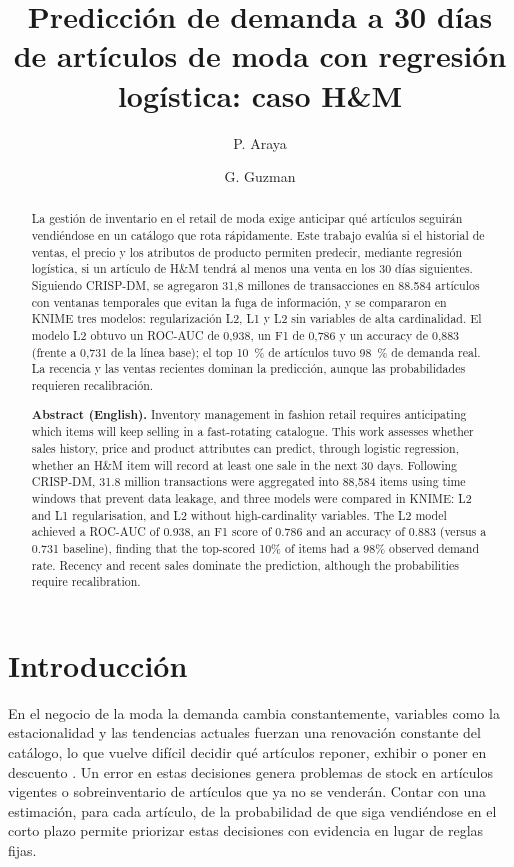 \documentclass[
  journal=largetwo,
  manuscript=Laboratorio-Numero-02,
  year=2026,
  volume=1
]{cup-journal}
\title{Predicción de demanda a 30 días de artículos de moda con regresión logística: caso H\&M}
\author{P. Araya}
\affiliation{C1, Universidad Católica del Norte, Coquimbo, Coquimbo, Chile}
\author{G. Guzman}
\affiliation{C1, Universidad Católica del Norte, Coquimbo, Coquimbo, Chile}
\begin{document}
\begin{abstract}
La gestión de inventario en el retail de moda exige anticipar qué artículos seguirán vendiéndose en un catálogo que rota rápidamente. Este trabajo evalúa si el historial de ventas, el precio y los atributos de producto permiten predecir, mediante regresión logística, si un artículo de H\&M tendrá al menos una venta en los 30 días siguientes. Siguiendo CRISP-DM, se agregaron 31,8 millones de transacciones en 88.584 artículos con ventanas temporales que evitan la fuga de información, y se compararon en KNIME tres modelos: regularización L2, L1 y L2 sin variables de alta cardinalidad. El modelo L2 obtuvo un ROC-AUC de 0,938, un F1 de 0,786 y un accuracy de 0,883 (frente a 0,731 de la línea base); el top 10~\% de artículos tuvo 98~\% de demanda real. La recencia y las ventas recientes dominan la predicción, aunque las probabilidades requieren recalibración.

\medskip
\textbf{Abstract (English).} Inventory management in fashion retail requires anticipating which items will keep selling in a fast-rotating catalogue. This work assesses whether sales history, price and product attributes can predict, through logistic regression, whether an H\&M item will record at least one sale in the next 30 days. Following CRISP-DM, 31.8 million transactions were aggregated into 88,584 items using time windows that prevent data leakage, and three models were compared in KNIME: L2 and L1 regularisation, and L2 without high-cardinality variables. The L2 model achieved a ROC-AUC of 0.938, an F1 score of 0.786 and an accuracy of 0.883 (versus a 0.731 baseline), finding that the top-scored 10\% of items had a 98\% observed demand rate. Recency and recent sales dominate the prediction, although the probabilities require recalibration.
\end{abstract}

\section{Introducción}

En el negocio de la moda la demanda cambia constantemente, variables como la estacionalidad y las tendencias actuales fuerzan una renovación constante del catálogo, lo que vuelve difícil decidir qué artículos reponer, exhibir o poner en descuento \autocite{fildes2022retail}. Un error en estas decisiones genera problemas de stock en artículos vigentes o sobreinventario de artículos que ya no se venderán. Contar con una estimación, para cada artículo, de la probabilidad de que siga vendiéndose en el corto plazo permite priorizar estas decisiones con evidencia en lugar de reglas fijas.
\end{document}

